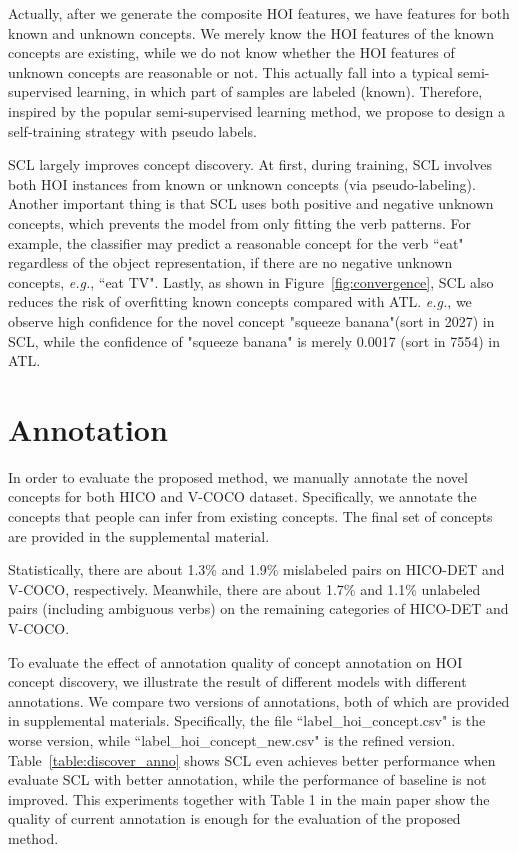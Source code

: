 \documentclass[runningheads]{llncs}
\newcommand{\eg}{\textit{e.g.}}
\begin{document}
Actually, after we generate the composite HOI features, we have features for both known and unknown concepts. We merely know the HOI features of the known concepts are existing, while we do not know whether the HOI features of unknown concepts are reasonable or not. This actually fall into a typical semi-supervised learning, in which part of samples are labeled (known). Therefore, inspired by the popular semi-supervised learning method, we propose to design a self-training strategy with pseudo labels.

SCL largely improves concept discovery. At first, during training, SCL involves both HOI instances from known or unknown concepts (via pseudo-labeling). Another important thing is that SCL uses both positive and negative unknown concepts, which prevents the model from only fitting the verb patterns. {\small For example, the classifier may predict a reasonable concept for the verb ``eat" regardless of the object representation, if there are no negative unknown concepts, \eg, ``eat TV". Lastly, as shown in Figure~\ref{fig:convergence}, SCL also reduces the risk of overfitting known concepts compared with ATL. \eg, we observe high confidence for the novel concept "squeeze banana"(sort in 2027) in SCL, while the confidence of "squeeze banana" is merely 0.0017 (sort in 7554) in ATL.}

\section{Annotation}
\label{sec:annotation}



In order to evaluate the proposed method, we manually annotate the novel concepts for both HICO and V-COCO dataset. Specifically, we annotate the concepts that people can infer from existing concepts. The final set of concepts are provided in the supplemental material. 

Statistically, there are about 1.3\% and 1.9\% mislabeled pairs on HICO-DET and V-COCO, respectively. Meanwhile, there are about 1.7\% and 1.1\% unlabeled pairs (including ambiguous verbs) on the remaining categories of HICO-DET and V-COCO.

To evaluate the effect of annotation quality of concept annotation on HOI concept discovery, we illustrate the result of different models with different annotations. We compare two versions of annotations, both of which are provided in supplemental materials. Specifically, the file ``label\_hoi\_concept.csv" is the worse version, while ``label\_hoi\_concept\_new.csv" is the refined version. Table~\ref{table:discover_anno} shows SCL even achieves better performance when evaluate SCL with better annotation, while the performance of baseline is not improved. This experiments together with Table 1 in the main paper show the quality of current annotation is enough for the evaluation of the proposed method.
\end{document}
